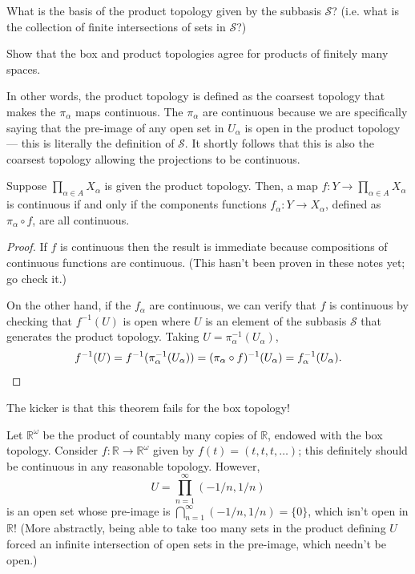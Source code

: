 \documentclass[11pt]{scrartcl}
\providecommand{\RR}{\mathbb R}
\providecommand{\inv}{^{-1}}
\begin{document}
\begin{exercise}
    What is the basis of the product topology
    given by the subbasis $\mathcal S$?
    (i.e. what is the collection of
    finite intersections of sets in $\mathcal S$?)
\end{exercise}

\begin{exercise}
    Show that the box and product topologies agree
    for products of finitely many spaces.
\end{exercise}

In other words, the product topology is defined as the coarsest topology
that makes the $\pi_\alpha$ maps continuous.
The $\pi_\alpha$ are continuous because we are specifically saying that
the pre-image of any open set in $U_\alpha$ is open
in the product topology --- this is literally the definition of $\mathcal S$.
It shortly follows that this is also the coarsest topology
allowing the projections to be continuous.

\begin{theorem}
    \label{thm:f-cont-iff-components-cont}
    Suppose $\prod_{\alpha\in A} X_\alpha$ is given the product topology.
    Then, a map $f\colon Y\to\prod_{\alpha\in A}X_\alpha$ is continuous
    if and only if the components functions $f_\alpha\colon Y\to X_\alpha$,
    defined as $\pi_\alpha\circ f$, are all continuous.
\end{theorem}

\begin{proof}
    If $f$ is continuous then the result is immediate
    because compositions of continuous functions are continuous.
    (This hasn't been proven in these notes yet; go check it.)

    On the other hand, if the $f_\alpha$ are continuous,
    we can verify that $f$ is continuous by checking that $f\inv(U)$ is open
    where $U$ is an element of the subbasis $\mathcal S$
    that generates the product topology. Taking $U = \pi_\alpha\inv(U_\alpha)$,
    \begin{equation*}
        f\inv(U) = f\inv(\pi_\alpha\inv(U_\alpha)) =
	(\pi_\alpha\circ f)\inv(U_\alpha) = f_\alpha\inv(U_\alpha).\qedhere
    \end{equation*}
\end{proof}

The kicker is that this theorem fails for the box topology!
\begin{example}
    Let $\RR^\omega$ be the product of countably many copies of $\RR$,
    endowed with the box topology.
    Consider $f\colon\RR\to\RR^\omega$ given by
    $f(t) = (t, t, t, \dots)$; this definitely should be continuous
    in any reasonable topology. However,
    \begin{equation*}
	U = \prod_{n=1}^\infty (-1/n, 1/n)
    \end{equation*}
    is an open set whose pre-image is $\bigcap_{n=1}^\infty (-1/n,1/n) = \{0\}$,
    which isn't open in $\RR$!
    (More abstractly, being able to take too many sets in the product
    defining $U$ forced an infinite intersection of open sets
    in the pre-image, which needn't be open.)
\end{example}
\end{document}
